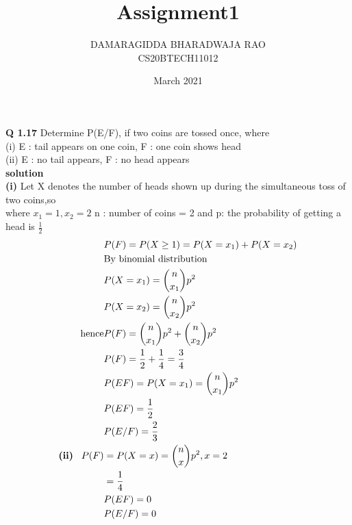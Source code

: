 \documentclass{article}
\title{Assignment1}
\author{DAMARAGIDDA BHARADWAJA RAO\\CS20BTECH11012}
\date{March 2021}
\begin{document}
\maketitle
\begin{multicols*}{2}
\noindent
\textbf{Q 1.17} Determine P(E/F), if two coins are tossed
once, where\\
(i) E : tail appears on one coin, F : one coin
shows head\\
\vspace{0.5cm}
(ii) E : no tail appears, F : no head appears\\
\textbf{solution}\\
\textbf{(i)} Let X denotes the number of heads shown up during the simultaneous toss of two coins,so \\
where $ x_1 = 1,x_2 = 2 $  n : number of coins = 2 and p: the probability of getting a head is $\frac{1}{2}$
\begin{align*}
&P(F)=P(X\geq 1)=P(X=x_1)+P(X=x_2)\\\
&\text{By binomial distribution}\\
&P(X=x_1)=\binom{n}{x_1} p ^2\\
&P(X=x_2)=\binom{n}{x_2} p ^2\\
\text{hence} &P(F) = \binom{n}{x_1} p ^2 + \binom{n}{x_2} p ^2\\
&P(F) = \frac{1}{2} + \frac{1}{4} = \frac{3}{4}\\
&P(EF) = P(X=x_1)=\binom{n}{x_1} p ^2\\
&P(EF) = \frac{1}{2}\\
&P(E/F) = \frac{2}{3}\\
\textbf{(ii)}\hspace{0.3cm}P(F) &=P(X=x)= \binom{n}{x} p^2, x = 2\\
& = \frac{1}{4}\\
&P(EF) = 0\\
&P(E/F) = 0
\end{align*}
\end{multicols*}
\end{document}
